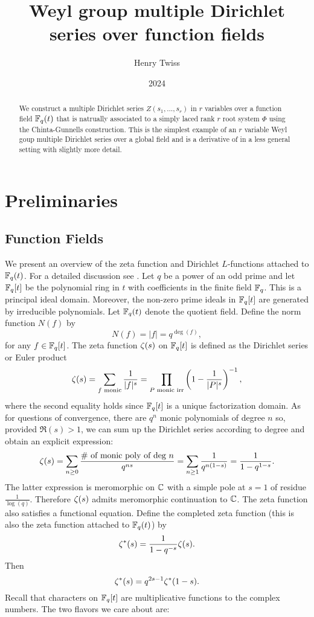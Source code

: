 \documentclass[12pt,reqno,oneside]{amsart}
\title{Weyl group multiple Dirichlet series over function fields}
\author{Henry Twiss}
\date{2024}
\begin{document}
\begin{abstract}
    We construct a multiple Dirichlet series $Z(s_{1},\ldots,s_{r})$ in $r$ variables over a function field $\mathbb{F}_{q}(t)$ that is natrually associated to a simply laced rank $r$ root system $\Phi$ using the Chinta-Gunnells construction. This is the simplest example of an $r$ variable Weyl goup multiple Dirichlet series over a global field and is a derivative of \cite{CG} in a less general setting with slightly more detail. 
\end{abstract}

\maketitle

\section{Preliminaries}
    \subsection*{Function Fields}
        We present an overview of the zeta function and Dirichlet $L$-functions attached to $\mathbb{F}_{q}(t)$. For a detailed discussion see \cite{R}. Let $q$ be a power of an odd prime and let $\mathbb{F}_{q}[t]$ be the polynomial ring in $t$ with coefficients in the finite field $\mathbb{F}_{q}$. This is a principal ideal domain. Moreover, the non-zero prime ideals in $\mathbb{F}_{q}[t]$ are generated by irreducible polynomials. Let $\mathbb{F}_{q}(t)$ denote the quotient field. Define the norm function $N(f)$ by
        \[
            N(f) = |f| = q^{\deg(f)},
        \]
        for any $f \in \mathbb{F}_{q}[t]$. The zeta function $\zeta(s)$ on $\mathbb{F}_{q}[t]$ is defined as the Dirichlet series or Euler product
        \[
            \zeta(s) = \sum_{\text{$f$ monic}}\frac{1}{|f|^{s}} = \prod_{\text{$P$ monic irr}}\left(1-\frac{1}{|P|^{s}}\right)^{-1},
        \]
        where the second equality holds since $\mathbb{F}_{q}[t]$ is a unique factorization domain. As for questions of convergence, there are $q^{n}$ monic polynomials of degree $n$ so, provided $\Re(s) > 1$, we can sum up the Dirichlet series according to degree and obtain an explicit expression:
        \[
            \zeta(s) = \sum_{n \ge 0}\frac{\text{\# of monic poly of deg $n$}}{q^{ns}} = \sum_{n \ge 1}\frac{1}{q^{n(1-s)}} = \frac{1}{1-q^{1-s}}.
        \]
        The latter expression is meromorphic on $\mathbb{C}$ with a simple pole at $s = 1$ of residue $\frac{1}{\log(q)}$. Therefore $\zeta(s)$ admits meromorphic continuation to $\mathbb{C}$. The zeta function also satisfies a functional equation. Define the completed zeta function (this is also the zeta function attached to $\mathbb{F}_{q}(t)$) by
        \[
            \zeta^{\ast}(s) = \frac{1}{1-q^{-s}}\zeta(s).
        \]
        Then
        \[
            \zeta^{\ast}(s) = q^{2s-1}\zeta^{\ast}(1-s).
        \]
        Recall that characters on $\mathbb{F}_{q}[t]$ are multiplicative functions to the complex numbers. The two flavors we care about are:
        
\end{document}
